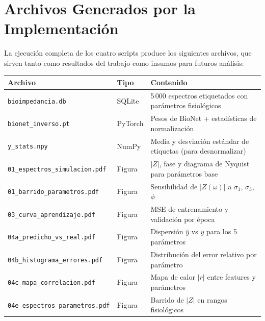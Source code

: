 \documentclass[12pt]{article}
\begin{document}

\section{Archivos Generados por la Implementaci\'on}

\label{sec:archivos}


La ejecuci\'on completa de los cuatro scripts produce los siguientes archivos,
que sirven tanto como resultados del trabajo como insumos para futuros an\'alisis:

\begin{center}
\renewcommand{\arraystretch}{1.35}
\begin{tabular}{@{}llp{7cm}@{}}
\toprule
\textbf{Archivo} & \textbf{Tipo} & \textbf{Contenido} \\
\midrule
\texttt{bioimpedancia.db}            & SQLite & 5\,000 espectros etiquetados con par\'ametros fisiol\'ogicos \\
\texttt{bionet\_inverso.pt}          & PyTorch & Pesos de BioNet + estad\'isticas de normalizaci\'on \\
\texttt{y\_stats.npy}                & NumPy & Media y desviaci\'on est\'andar de etiquetas (para desnormalizar) \\
\texttt{01\_espectros\_simulacion.pdf} & Figura & $|Z|$, fase y diagrama de Nyquist para par\'ametros base \\
\texttt{01\_barrido\_parametros.pdf}   & Figura & Sensibilidad de $|Z(\omega)|$ a $\sigma_1$, $\sigma_3$, $\phi$ \\
\texttt{03\_curva\_aprendizaje.pdf}    & Figura & MSE de entrenamiento y validaci\'on por \'epoca \\
\texttt{04a\_predicho\_vs\_real.pdf}   & Figura & Dispersi\'on $\hat{y}$ vs $y$ para los 5 par\'ametros \\
\texttt{04b\_histograma\_errores.pdf}  & Figura & Distribuci\'on del error relativo por par\'ametro \\
\texttt{04c\_mapa\_correlacion.pdf}    & Figura & Mapa de calor $|r|$ entre features y par\'ametros \\
\texttt{04e\_espectros\_parametros.pdf}& Figura & Barrido de $|Z|$ en rangos fisiol\'ogicos \\
\bottomrule
\end{tabular}
\end{center}
\end{document}
